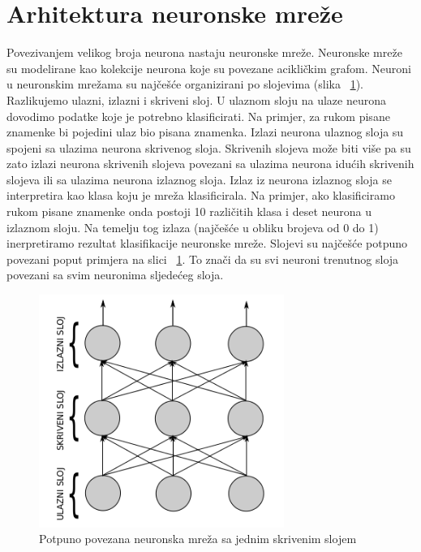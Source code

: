 \documentclass[times, utf8, zavrsni, numeric]{fer}
\begin{document}
\section{Arhitektura neuronske mreže}
Povezivanjem velikog broja neurona nastaju neuronske mreže. Neuronske mreže su modelirane kao kolekcije neurona koje su povezane acikličkim grafom. Neuroni u neuronskim mrežama su najčešće organizirani po slojevima (slika ~\ref{fig:neuronska-mreza}). Razlikujemo ulazni, izlazni i skriveni sloj. U ulaznom sloju na ulaze neurona dovodimo podatke koje je potrebno klasificirati. Na primjer, za rukom pisane znamenke bi pojedini ulaz bio pisana znamenka. Izlazi neurona ulaznog sloja su spojeni sa ulazima neurona skrivenog sloja. Skrivenih slojeva može biti više pa su zato izlazi neurona skrivenih slojeva povezani sa ulazima neurona idućih skrivenih slojeva ili sa ulazima neurona izlaznog sloja. Izlaz iz neurona izlaznog sloja se interpretira kao klasa koju je mreža klasificirala. Na primjer, ako klasificiramo rukom pisane znamenke onda postoji 10 različitih klasa i deset neurona u izlaznom sloju. Na temelju tog izlaza (najčešće u obliku brojeva od 0 do 1) inerpretiramo rezultat klasifikacije neuronske mreže. Slojevi su najčešće potpuno povezani poput primjera na slici ~\ref{fig:neuronska-mreza}. To znači da su svi neuroni trenutnog sloja povezani sa svim neuronima sljedećeg sloja.

\begin{figure}
    \centering
    \includegraphics[width=8cm]{img/slojevi-neuronska-mreza.png}
    \caption{Potpuno povezana neuronska mreža sa jednim skrivenim slojem}
    \label{fig:neuronska-mreza}
\end{figure}
\end{document}

